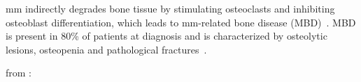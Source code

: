 \ac{mm} indirectly degrades bone tissue by stimulating osteoclasts and inhibiting
osteoblast differentiation, which leads to \ac{mm}-related bone disease
(MBD)~\cite{glaveyProteomicCharacterizationHuman2017}. MBD is present in 80\% of
patients at diagnosis and is characterized by osteolytic lesions, osteopenia and
pathological fractures~\cite{terposPathogenesisBoneDisease2018}.


from \cite{forsterMolecularImpactTumor2022}:






